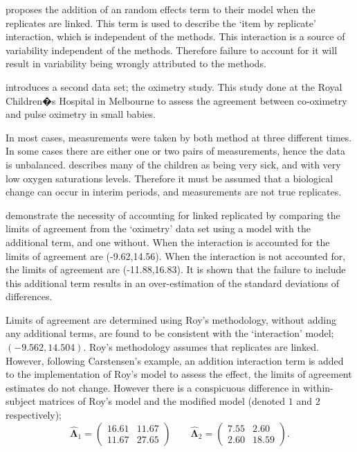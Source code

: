 \documentclass[12pt, a4paper]{report}
\theoremstyle{plain}
\theoremstyle{definition}
\theoremstyle{remark}
\begin{document}
	\citet{BXC2008} proposes the addition of an random effects term to their model when the replicates are linked. This term is used to describe the `item by replicate' interaction, which is independent of the methods. This interaction is a source of variability independent of the methods. Therefore failure to account for it will result in variability being wrongly attributed to the methods.
	
	\citet{BXC2008} introduces a second data set; the oximetry study. This study done at the Royal Children�s Hospital in
	Melbourne to assess the agreement between co-oximetry and pulse oximetry in small babies.
	
	In most cases, measurements were taken by both method at three different times. In some cases there are either one or two pairs of measurements, hence the data is unbalanced. \citet{BXC2008} describes many of the children as being very sick, and with very low oxygen saturations levels. Therefore it must be assumed that a biological change can occur in interim periods, and measurements are not true replicates.
	
	\citet{BXC2008} demonstrate the necessity of accounting for linked replicated by comparing the limits of agreement from the `oximetry' data set using a model with the additional term, and one without. When the interaction is accounted for the limits of agreement are (-9.62,14.56). When the interaction is not accounted for, the limits of agreement are (-11.88,16.83). It is shown that the failure to include this additional term results in an over-estimation of the standard deviations of differences.
	
	Limits of agreement are determined using Roy's methodology, without adding any additional terms, are found to be consistent with the `interaction' model; $(-9.562, 14.504 )$. Roy's methodology assumes that replicates are linked. However, following Carstensen's example, an addition interaction term is added to the implementation of Roy's model to assess the effect, the limits of agreement estimates do not change. However there is a conspicuous difference in within-subject matrices of Roy's model and the modified model (denoted $1$ and $2$ respectively);
	\begin{equation}
		\hat{\boldsymbol{\Lambda}}_{1}= \left(\begin{array}{cc}
			16.61 &	11.67\\
			11.67 & 27.65 \end{array}\right) \qquad
		\boldsymbol{\hat{\Lambda}}_{2}= \left( \begin{array}{cc}
			7.55 & 2.60 \\
			2.60 & 18.59 \end{array} \right). 
	\end{equation}
	
\end{document}

